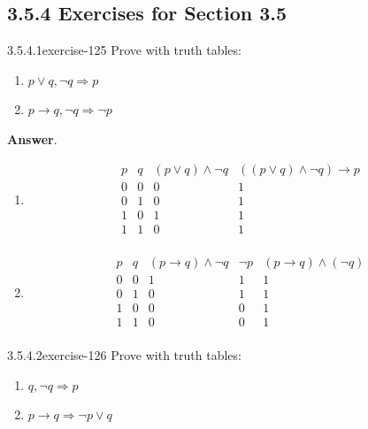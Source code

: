 \documentclass[twoside,10pt,]{book}
\numberwithin{equation}{section}
\begin{document}
\subsection*{3.5.4 Exercises for Section 3.5}
\begin{divisionsolution}{3.5.4.1}{}{exercise-125}%
\hypertarget{p-1094}{}%
Prove with truth tables:%
\par
\hypertarget{p-1095}{}%
\leavevmode%
\begin{enumerate}[label=(\alph*)]
\item\hypertarget{li-589}{}\hypertarget{p-1096}{}%
\(p\lor  q, \neg q\Rightarrow  p\)%
\item\hypertarget{li-590}{}\hypertarget{p-1097}{}%
\(p \rightarrow  q, \neg q \Rightarrow  \neg p\)%
\end{enumerate}
%
\par\smallskip%
\noindent\textbf{Answer}.\quad%
\hypertarget{p-1098}{}%
\leavevmode%
\begin{enumerate}[label=(\alph*)]
\item\hypertarget{li-591}{}\hypertarget{p-1099}{}%
%
\begin{equation*}
\begin{array}{cccc}
p & q &  (p\lor q)\land \neg q & ((p\lor q)\land \neg q)\to p \\
0 & 0 & 0 & 1 \\
0 & 1 & 0 & 1 \\
1 & 0 & 1 & 1 \\
1 & 1 & 0 & 1 \\
\end{array}
\end{equation*}
%
\item\hypertarget{li-592}{}\hypertarget{p-1100}{}%
%
\begin{equation*}
\begin{array}{ccccc}
p & q  & (p\to q)\land \neg q & \neg p & (p\to q)\land (\neg q) \\
0 & 0 & 1 & 1 & 1 \\
0 & 1 & 0 & 1 & 1 \\
1 & 0 & 0 & 0 & 1 \\
1 & 1 & 0 & 0 & 1 \\
\end{array}
\end{equation*}
%
\end{enumerate}
%
\end{divisionsolution}%
\begin{divisionsolution}{3.5.4.2}{}{exercise-126}%
\hypertarget{p-1101}{}%
Prove with truth tables:%
\par
\hypertarget{p-1102}{}%
\leavevmode%
\begin{enumerate}[label=(\alph*)]
\item\hypertarget{li-593}{}\hypertarget{p-1103}{}%
\(q, \neg q\Rightarrow  p\)%
\item\hypertarget{li-594}{}\hypertarget{p-1104}{}%
\(p \rightarrow  q \Rightarrow  \neg p \lor  q\)%
\end{enumerate}
%
\end{divisionsolution}%
\end{document}
